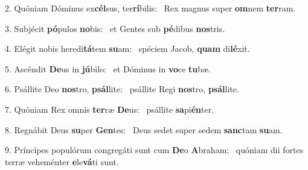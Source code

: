 2. Quóniam Dóminus ex\textbf{cél}sus, ter\textbf{rí}bilis: \ast\  Rex magnus super \textbf{om}nem \textbf{ter}ram.\

3. Subjécit \textbf{pó}pulos \textbf{no}bis: \ast\  et Gentes sub \textbf{pé}dibus \textbf{nos}tris.\

4. Elégit nobis heredi\textbf{tá}tem \textbf{su}am: \ast\  spéciem Jacob, \textbf{quam} di\textbf{lé}xit.\

5. Ascéndit \textbf{De}us in \textbf{jú}bilo: \ast\  et Dóminus in \textbf{vo}ce \textbf{tu}bæ.\

6. Psállite Deo \textbf{nos}tro, \textbf{psál}lite: \ast\  psállite Regi \textbf{nos}tro, \textbf{psál}lite.\

7. Quóniam Rex omnis \textbf{ter}ræ \textbf{De}us: \ast\  psállite \textbf{sa}pi\textbf{én}ter.\

8. Regnábit Deus \textbf{su}per \textbf{Gen}tes: \ast\  Deus sedet super sedem \textbf{sanc}tam \textbf{su}am.\

9. Príncipes populórum congregáti sunt cum \textbf{De}o \textbf{A}braham: \ast\  quóniam dii fortes terræ veheménter \textbf{e}le\textbf{vá}ti sunt.\

